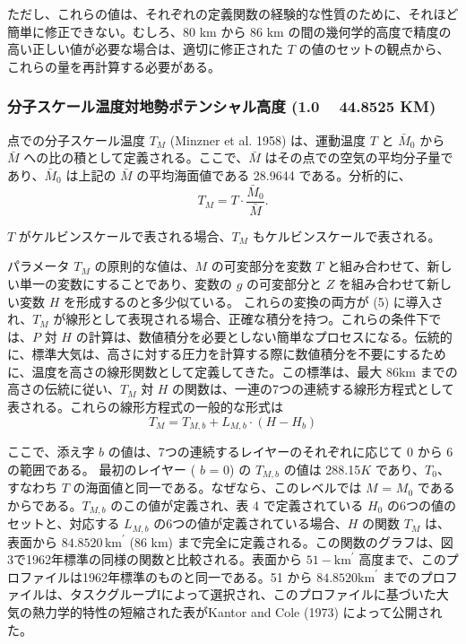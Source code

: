 \documentclass{article}
\begin{document}
ただし、これらの値は、それぞれの定義関数の経験的な性質のために、それほど簡単に修正できない。むしろ、80 km から 86 km の間の幾何学的高度で精度の高い正しい値が必要な場合は、適切に修正された $T$ の値のセットの観点から、これらの量を再計算する必要がある。

\subsubsection{分子スケール温度対地勢ポテンシャル高度 (1.0 ~ 44.8525 KM)}

点での分子スケール温度 $T_M$ (Minzner et al. 1958) は、運動温度 $T$ と $\bar{M}_0$ から $\bar{M}$ への比の積として定義される。ここで、$\bar{M}$ はその点での空気の平均分子量であり、$\bar{M}_0$ は上記の $\bar{M}$ の平均海面値である 28.9644 である。分析的に、
\begin{equation}
  T_M = T \cdot \frac{\bar{M}_0}{\bar{M}}. \tag{22}
\end{equation}

$T$ がケルビンスケールで表される場合、$T_M$ もケルビンスケールで表される。

パラメータ $T_M$ の原則的な値は、$M$ の可変部分を変数 $T$ と組み合わせて、新しい単一の変数にすることであり、変数の $g$ の可変部分と $Z$ を組み合わせて新しい変数 $H$ を形成するのと多少似ている。
これらの変換の両方が (5) に導入され、$T_M$ が線形として表現される場合、正確な積分を持つ。これらの条件下では、$P$ 対 $H$ の計算は、数値積分を必要としない簡単なプロセスになる。伝統的に、標準大気は、高さに対する圧力を計算する際に数値積分を不要にするために、温度を高さの線形関数として定義してきた。この標準は、最大 86km までの高さの伝統に従い、$T_M$ 対 $H$ の関数は、一連の7つの連続する線形方程式として表される。これらの線形方程式の一般的な形式は
\begin{equation}
  T_M = T_{M,b} + L_{M,b}\cdot (H - H_b)
  \tag{23}
\end{equation}

ここで、添え字 $b$ の値は、7つの連続するレイヤーのそれぞれに応じて 0 から 6 の範囲である。
最初のレイヤー ( $b$ = 0) の $T_{M,b}$ の値は 288.15$K$ であり、$T_0$、すなわち $T$ の海面値と同一である。なぜなら、このレベルでは $M$ = $M_0$ であるからである。$T_{M,b}$ のこの値が定義され、表 4 で定義されている $H_0$ の6つの値のセットと、対応する $L_{M,b}$ の6つの値が定義されている場合、$H$ の関数 $T_M$ は、表面から $84.8520 \, \text{km}^{\prime}$ (86 km) まで完全に定義される。この関数のグラフは、図3で1962年標準の同様の関数と比較される。表面から $51-\text{km}^\prime$ 高度まで、このプロファイルは1962年標準のものと同一である。51 から $84.8520 \text{km}^\prime$ までのプロファイルは、タスクグループIによって選択され、このプロファイルに基づいた大気の熱力学的特性の短縮された表がKantor and Cole (1973) によって公開された。
\end{document}
